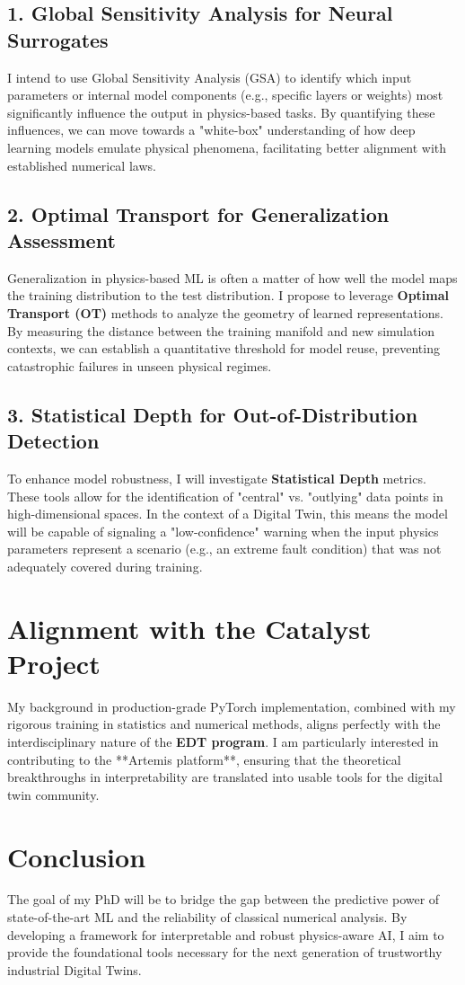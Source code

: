 \documentclass[a4paper,11pt]{article}
\begin{document}
\subsection{1. Global Sensitivity Analysis for Neural Surrogates}
I intend to use Global Sensitivity Analysis (GSA) to identify which input parameters or internal model components (e.g., specific layers or weights) most significantly influence the output in physics-based tasks. By quantifying these influences, we can move towards a "white-box" understanding of how deep learning models emulate physical phenomena, facilitating better alignment with established numerical laws.

\subsection{2. Optimal Transport for Generalization Assessment}
Generalization in physics-based ML is often a matter of how well the model maps the training distribution to the test distribution. I propose to leverage \textbf{Optimal Transport (OT)} methods to analyze the geometry of learned representations. By measuring the distance between the training manifold and new simulation contexts, we can establish a quantitative threshold for model reuse, preventing catastrophic failures in unseen physical regimes.

\subsection{3. Statistical Depth for Out-of-Distribution Detection}
To enhance model robustness, I will investigate \textbf{Statistical Depth} metrics. These tools allow for the identification of "central" vs. "outlying" data points in high-dimensional spaces. In the context of a Digital Twin, this means the model will be capable of signaling a "low-confidence" warning when the input physics parameters represent a scenario (e.g., an extreme fault condition) that was not adequately covered during training.

\section{Alignment with the Catalyst Project}
My background in production-grade PyTorch implementation, combined with my rigorous training in statistics and numerical methods, aligns perfectly with the interdisciplinary nature of the \textbf{EDT program}. I am particularly interested in contributing to the **Artemis platform**, ensuring that the theoretical breakthroughs in interpretability are translated into usable tools for the digital twin community.

\section{Conclusion}
The goal of my PhD will be to bridge the gap between the predictive power of state-of-the-art ML and the reliability of classical numerical analysis. By developing a framework for interpretable and robust physics-aware AI, I aim to provide the foundational tools necessary for the next generation of trustworthy industrial Digital Twins.
\end{document}
